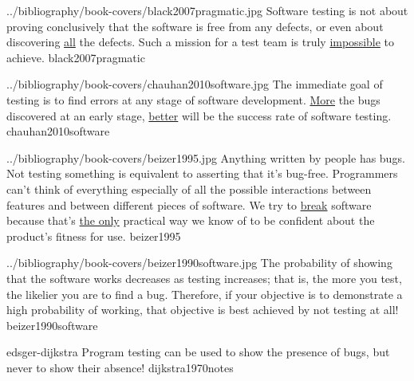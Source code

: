 \documentclass{article}
\begin{document}
\lnQuote
  {../bibliography/book-covers/black2007pragmatic.jpg}
  {Software testing is not about proving conclusively that the software is free from any defects, or even about discovering \ul{all} the defects. Such a mission for a test team is truly \ul{impossible} to achieve.}
  {black2007pragmatic}

\lnQuote
  {../bibliography/book-covers/chauhan2010software.jpg}
  {The immediate goal of testing is to find errors at any stage of software development. \ul{More} the bugs discovered at an early stage, \ul{better} will be the success rate of software testing.}
  {chauhan2010software}

\lnQuote
  {../bibliography/book-covers/beizer1995.jpg}
  {Anything written by people has bugs. Not testing something is equivalent to asserting that it's bug-free. Programmers can't think of everything especially of all the possible interactions between features and between different pieces of software. We try to \ul{break} software because that's \ul{the only} practical way we know of to be confident about the product's fitness for use.}
  {beizer1995}

\lnQuote
  {../bibliography/book-covers/beizer1990software.jpg}
  {The probability of showing that the software works decreases as testing increases; that is, the more you test, the likelier you are to find a bug. Therefore, if your objective is to demonstrate a high probability of working, that objective is best achieved by not testing at all!}
  {beizer1990software}

\lnQuote
    {edsger-dijkstra}
    {Program testing can be used to show the presence of bugs, but never to show their absence!}
    {dijkstra1970notes}

\end{document}
